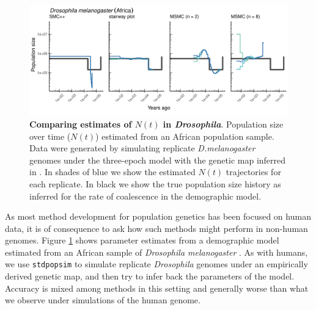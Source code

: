 \documentclass[12pt,halfline,a4paper]{ouparticle}
\newcommand{\stdpopsim}{\texttt{stdpopsim}\xspace}
\begin{document}
\begin{figure}
\begin{center}
\includegraphics[width=0.8\linewidth]{display_items/d_mel_Sheehan_mask2.png}
\caption{\textbf{Comparing estimates of $N(t)$ in \emph{Drosophila}}. Population
size over time ($N(t)$) estimated from an African population sample. Data were generated by simulating
replicate \emph{D.melanogaster} genomes under the three-epoch \cite{sheehan2016deep} model
with the genetic map inferred in \cite{comeron2012many}. In shades of blue we show the estimated
$N(t)$ trajectories for each replicate. In black we show the true population size history as inferred
for the rate of coalescence in the demographic model.}
\label{fig:n_t_sheehan}
\end{center}
\end{figure}

As most method development for population genetics has been focused on human
data, it is of consequence to ask how such methods might perform in non-human
genomes. Figure \ref{fig:n_t_sheehan} shows parameter estimates from a demographic
model estimated from an African sample of \emph{Drosophila melanogaster} \citep{sheehan2016deep}.
As with humans, we use \stdpopsim to simulate replicate \emph{Drosophila} genomes under
an empirically derived genetic map, and then try to infer back the parameters of the model.
Accuracy is mixed among methods in this setting and generally worse than what we
observe under simulations of the human genome.
\end{document}
